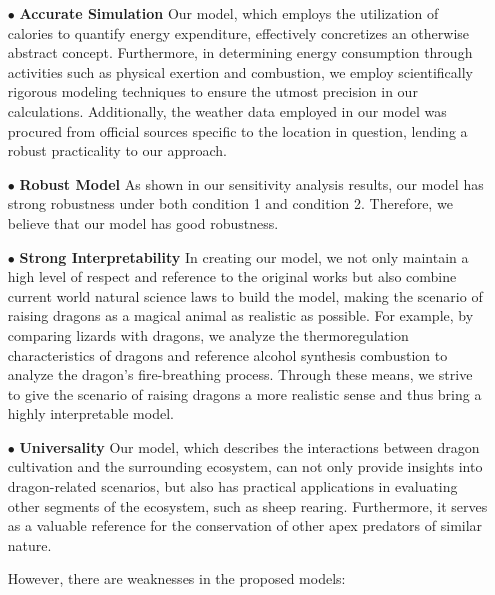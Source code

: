 \documentclass[12pt]{article}  %
\begin{document}
\begin{itemize}

\item[$\bullet$] \textbf{Accurate Simulation }Our model, which employs the utilization of calories to quantify energy expenditure, effectively concretizes an otherwise abstract concept. Furthermore, in determining energy consumption through activities such as physical exertion and combustion, we employ scientifically rigorous modeling techniques to ensure the utmost precision in our calculations. Additionally, the weather data employed in our model was procured from official sources specific to the location in question, lending a robust practicality to our approach.

\item[$\bullet$] \textbf{Robust Model }As shown in our sensitivity analysis results, our model has strong robustness under both condition 1 and condition 2. Therefore, we believe that our model has good robustness.

\item[$\bullet$] \textbf{Strong Interpretability }In creating our model, we not only maintain a high level of respect and reference to the original works but also combine current world natural science laws to build the model, making the scenario of raising dragons as a magical animal as realistic as possible. For example, by comparing lizards with dragons, we analyze the thermoregulation characteristics of dragons and reference alcohol synthesis combustion to analyze the dragon's fire-breathing process. Through these means, we strive to give the scenario of raising dragons a more realistic sense and thus bring a highly interpretable model.

\item[$\bullet$] \textbf{Universality } Our model, which describes the interactions between dragon cultivation and the surrounding ecosystem, can not only provide insights into dragon-related scenarios, but also has practical applications in evaluating other segments of the ecosystem, such as sheep rearing. Furthermore, it serves as a valuable reference for the conservation of other apex predators of similar nature.

However, there are weaknesses in the proposed models:
\end{itemize}
\vspace{-1cm}
\end{document}
